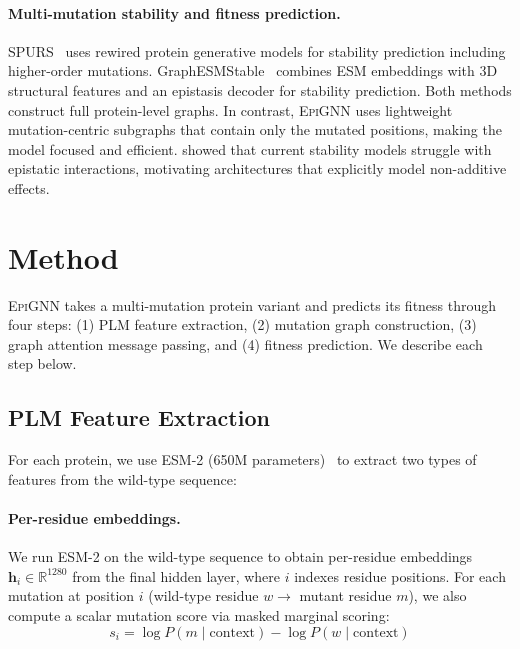 \documentclass{article}
\newcommand{\epignn}{\textsc{EpiGNN}}
\newcommand{\bh}{\mathbf{h}}
\newcommand{\R}{\mathbb{R}}
\begin{document}
\paragraph{Multi-mutation stability and fitness prediction.}
SPURS~\citep{li2025spurs} uses rewired protein generative models for stability prediction including higher-order mutations.
GraphESMStable~\citep{zhang2026graphesmstable} combines ESM embeddings with 3D structural features and an epistasis decoder for stability prediction.
Both methods construct full protein-level graphs.
In contrast, \epignn{} uses lightweight mutation-centric subgraphs that contain only the mutated positions, making the model focused and efficient.
\citet{dieckhaus2025protein} showed that current stability models struggle with epistatic interactions, motivating architectures that explicitly model non-additive effects.

\section{Method}
\label{sec:method}

\epignn{} takes a multi-mutation protein variant and predicts its fitness through four steps: (1) PLM feature extraction, (2) mutation graph construction, (3) graph attention message passing, and (4) fitness prediction.
We describe each step below.

\subsection{PLM Feature Extraction}

For each protein, we use ESM-2 (650M parameters)~\citep{lin2023evolutionary} to extract two types of features from the wild-type sequence:

\paragraph{Per-residue embeddings.}
We run ESM-2 on the wild-type sequence to obtain per-residue embeddings $\bh_i \in \R^{1280}$ from the final hidden layer, where $i$ indexes residue positions.
For each mutation at position $i$ (wild-type residue $w \to$ mutant residue $m$), we also compute a scalar mutation score via masked marginal scoring:
\begin{equation}
    s_i = \log P(m \mid \text{context}) - \log P(w \mid \text{context})
\end{equation}
\end{document}
